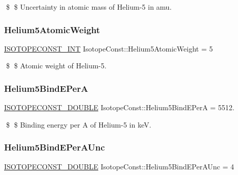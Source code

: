 \$ \$ Uncertainty in atomic mass of Helium-\/5 in amu. \mbox{\label{group___isotope_const-_helium-_he5_ga91f920ef312509f1a48c2673046fe9f9}} 
\subsubsection{\texorpdfstring{Helium5\+Atomic\+Weight}{Helium5AtomicWeight}}
{\footnotesize\ttfamily \mbox{\hyperlink{group___isotope_const-_macros_ga5f18360b3e99483a35c32d789e62621c}{I\+S\+O\+T\+O\+P\+E\+C\+O\+N\+S\+T\+\_\+\+I\+NT}} Isotope\+Const\+::\+Helium5\+Atomic\+Weight = 5}

\$ \$ Atomic weight of Helium-\/5. \mbox{\label{group___isotope_const-_helium-_he5_ga3297175dd79013cdb572bd3a135480c9}} 
\subsubsection{\texorpdfstring{Helium5\+Bind\+E\+PerA}{Helium5BindEPerA}}
{\footnotesize\ttfamily \mbox{\hyperlink{group___isotope_const-_macros_ga8f45a7272ce02c0b4c65c44636ed719a}{I\+S\+O\+T\+O\+P\+E\+C\+O\+N\+S\+T\+\_\+\+D\+O\+U\+B\+LE}} Isotope\+Const\+::\+Helium5\+Bind\+E\+PerA = 5512.}

\$ \$ Binding energy per A of Helium-\/5 in keV. \mbox{\label{group___isotope_const-_helium-_he5_ga914f0b9db9f4015c16c27cef5eca5a70}} 
\subsubsection{\texorpdfstring{Helium5\+Bind\+E\+Per\+A\+Unc}{Helium5BindEPerAUnc}}
{\footnotesize\ttfamily \mbox{\hyperlink{group___isotope_const-_macros_ga8f45a7272ce02c0b4c65c44636ed719a}{I\+S\+O\+T\+O\+P\+E\+C\+O\+N\+S\+T\+\_\+\+D\+O\+U\+B\+LE}} Isotope\+Const\+::\+Helium5\+Bind\+E\+Per\+A\+Unc = 4}

